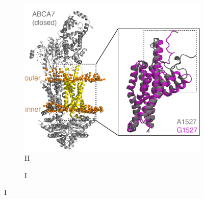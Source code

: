 \begin{figure}[H]
\begin{subfigure}[t]{0.45\textwidth}
    \end{subfigure}
    \begin{subfigure}[t]{0.3\textwidth}
        \caption{H}
        \includegraphics[width=\textwidth]{./main_plots/abca7_structure_with_inset.png}        
    \end{subfigure}
    \begin{subfigure}[t]{0.165\textwidth}
        \caption{I}

\end{subfigure}
\end{figure}
